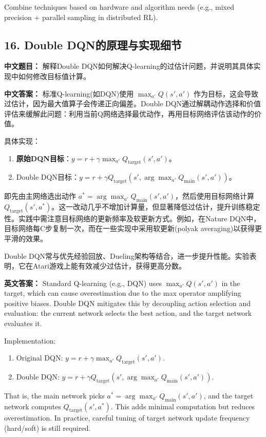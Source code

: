 \documentclass[10pt,a4paper]{ctexart}
\begin{document}
Combine techniques based on hardware and algorithm needs (e.g., mixed precision + parallel sampling in distributed RL).

\subsection*{16. Double DQN的原理与实现细节}
\textbf{中文题目：} 解释Double DQN如何解决Q-learning的过估计问题，并说明其具体实现中如何修改目标值计算。

\textbf{中文答案：}  
标准Q-learning(如DQN)使用 \(\max_{a'} Q(s',a')\) 作为目标，这会导致过估计，因为最大值算子会传递正向偏差。Double DQN通过解耦动作选择和价值评估来缓解此问题：利用当前Q网络选择最优动作，再用目标网络评估该动作的价值。

具体实现：
\begin{enumerate}
    \item \textbf{原始DQN目标}：\(y = r + \gamma \max_{a'} Q_{\text{target}}(s', a')\)。
    \item Double DQN目标：\(y = r + \gamma Q_{\text{target}}(s', \arg\max_{a'} Q_{\text{main}}(s', a'))\)。
\end{enumerate}

即先由主网络选出动作 \(a^* = \arg\max_{a'} Q_{\text{main}}(s', a')\)，然后使用目标网络计算 \(Q_{\text{target}}(s', a^*)\)。这一改动几乎不增加计算量，但显著降低过估计，提升训练稳定性。实践中需注意目标网络的更新频率及软更新方式。例如，在Nature DQN中，目标网络每C步复制一次，而在一些实现中采用软更新(polyak averaging)以获得更平滑的效果。

Double DQN常与优先经验回放、Dueling架构等结合，进一步提升性能。实验表明，它在Atari游戏上能有效减少过估计，获得更高分数。

\textbf{英文答案：}  
Standard Q-learning (e.g., DQN) uses \(\max_{a'} Q(s',a')\) in the target, which can cause overestimation due to the max operator amplifying positive biases. Double DQN mitigates this by decoupling action selection and evaluation: the current network selects the best action, and the target network evaluates it.

Implementation:
\begin{enumerate}
    \item Original DQN: \(y = r + \gamma \max_{a'} Q_{\text{target}}(s', a')\).
    \item Double DQN: \(y = r + \gamma Q_{\text{target}}(s', \arg\max_{a'} Q_{\text{main}}(s', a'))\).
\end{enumerate}

That is, the main network picks \(a^* = \arg\max_{a'} Q_{\text{main}}(s', a')\), and the target network computes \(Q_{\text{target}}(s', a^*)\). This adds minimal computation but reduces overestimation. In practice, careful tuning of target network update frequency (hard/soft) is still required.
\end{document}

